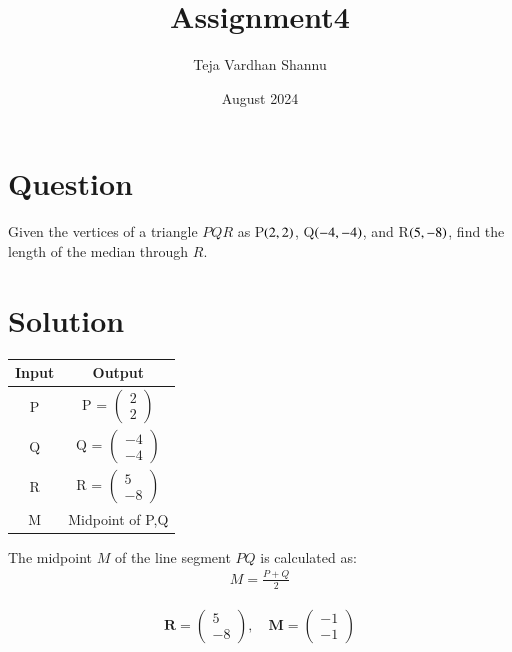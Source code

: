 \documentclass[journal]{IEEEtran}
\title{Assignment4}
\author{Teja Vardhan Shannu}
\date{August 2024}
\numberwithin{equation}{enumi}
\numberwithin{figure}{enumi}
\begin{document}
\maketitle

\section*{Question}
Given the vertices of a triangle \( PQR \) as P$\left(2,2\right)$, Q$\left(-4,-4\right)$, and R$\left(5,-8\right)$, find the length of the median through \( R \).

\section*{Solution}


\begin{table}[h!]
\centering    

\begin{tabular}{|c|c|}
\hline

Input & Output \\
\hline
P & {P} = $\begin{pmatrix} 2 \\ 2 \end{pmatrix}$ \\
Q & {Q} = $\begin{pmatrix} -4 \\ -4 \end{pmatrix}$\\
R & {R} = $\begin{pmatrix} 5 \\ -8 \end{pmatrix} $\\
M & Midpoint of P,Q    \\

\hline
\end{tabular}
\end{table}






The midpoint \( M \) of the line segment \( PQ \) is calculated as:
\begin{align}
M =  \frac{P + Q}{2}
\end{align}




\begin{align}
\mathbf{R} = \begin{pmatrix} 5 \\ -8 \end{pmatrix}, \quad \mathbf{M} = \begin{pmatrix} -1 \\ -1 \end{pmatrix}
\end{align}
\end{document}
